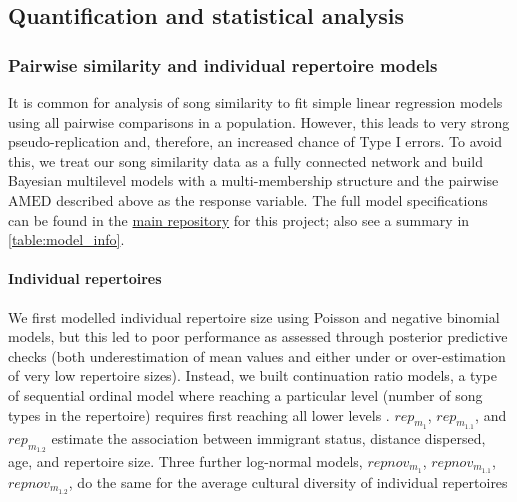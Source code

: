 \documentclass[9pt, twocolumn, twoside]{gsajnl}
\begin{document}
\subsection{Quantification and statistical analysis}

\subsubsection{Pairwise similarity and individual repertoire models}

It is common for analysis of song similarity to fit simple linear regression models using all pairwise comparisons in a population. However, this leads to very strong pseudo-replication and, therefore, an increased chance of Type I errors. To avoid this, we treat our song similarity data as a fully connected network and build Bayesian multilevel models with a multi-membership structure and the pairwise $\text{AMED}$ described above as the response variable. The full model specifications can be found in the \href{https://github.com/nilomr/birdsong-demography}{main repository} for this project; also see a summary in \autoref{table:model_info}.

\paragraph{Individual repertoires}
We first modelled individual repertoire size using Poisson and negative binomial models, but this led to poor performance as assessed through posterior predictive checks (both underestimation of mean values and either under or over-estimation of very low repertoire sizes). Instead, we built continuation ratio models, a type of sequential ordinal model where reaching a particular level (number of song types in the repertoire) requires first reaching all lower levels \parencite{chambers2023, warti2020}. $rep_{m_1}$, $rep_{m_{1.1}}$, and $rep_{m_{1.2}}$ estimate the association between immigrant status, distance dispersed, age, and repertoire size. Three further log-normal models, $repnov_{m_1}$, $repnov_{m_{1.1}}$, $repnov_{m_{1.2}}$, do the same for the average cultural diversity of individual repertoires
\end{document}
